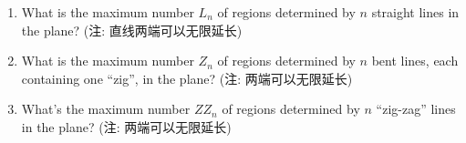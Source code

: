 \documentclass[a4paper, justified]{tufte-handout}
\begin{document}
\begin{solution}
\end{solution}

\begin{problem}
\end{problem}

\begin{solution}
\end{solution}

\begin{problem}
  \begin{enumerate}[(1)]
    \item What is the maximum number $L_n$ of regions 
      determined by $n$ straight lines in the plane?
      (注: 直线两端可以无限延长)
    \item What is the maximum number $Z_n$ of regions 
      determined by $n$ bent lines, each containing one ``zig'', 
      in the plane?
      (注: 两端可以无限延长)
    \item What's the maximum number $ZZ_n$ of regions
      determined by $n$ ``zig-zag'' lines in the plane?
      (注: 两端可以无限延长)
  \end{enumerate}
\end{problem}

\begin{solution}
\end{solution}

\begin{problem}
\end{problem}

\begin{solution}
\end{solution}

\begin{problem}
\end{problem}

\begin{solution}
\end{solution}
\end{document}
